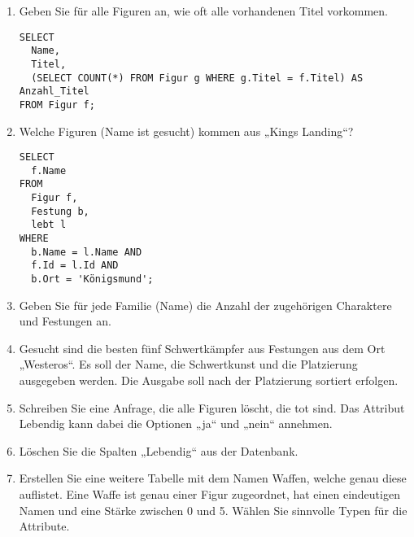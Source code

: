 \documentclass{lehramt-informatik-aufgabe}
\begin{document}
\begin{enumerate}
\item Geben Sie für alle Figuren an, wie oft alle vorhandenen Titel
vorkommen.

\begin{antwort}
\begin{verbatim}
SELECT
  Name,
  Titel,
  (SELECT COUNT(*) FROM Figur g WHERE g.Titel = f.Titel) AS Anzahl_Titel
FROM Figur f;
\end{verbatim}
\end{antwort}

\item Welche Figuren (Name ist gesucht) kommen aus „Kings Landing“?

\begin{antwort}
\begin{verbatim}
SELECT
  f.Name
FROM
  Figur f,
  Festung b,
  lebt l
WHERE
  b.Name = l.Name AND
  f.Id = l.Id AND
  b.Ort = 'Königsmund';
\end{verbatim}
\end{antwort}

\item Geben Sie für jede Familie (Name) die Anzahl der zugehörigen
Charaktere und Festungen an.

\item Gesucht sind die besten fünf Schwertkämpfer aus Festungen aus dem
Ort „Westeros“. Es soll der Name, die Schwertkunst und die Platzierung
ausgegeben werden. Die Ausgabe soll nach der Platzierung sortiert
erfolgen.

\item Schreiben Sie eine Anfrage, die alle Figuren löscht, die tot sind.
Das Attribut Lebendig kann dabei die Optionen „ja“ und „nein“ annehmen.

\item Löschen Sie die Spalten „Lebendig“ aus der Datenbank.

\item Erstellen Sie eine weitere Tabelle mit dem Namen Waffen, welche
genau diese auflistet. Eine Waffe ist genau einer Figur zugeordnet, hat
einen eindeutigen Namen und eine Stärke zwischen 0 und 5. Wählen Sie
sinnvolle Typen für die Attribute.
\end{enumerate}
\end{document}
